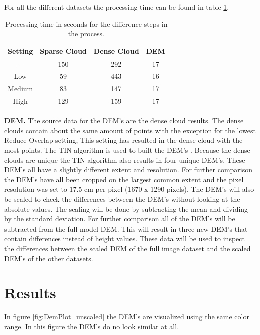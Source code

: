 \documentclass{isprs} %
\begin{document}
For all the different datasets the processing time can be found in table \ref{tab:processingTime}. 

\begin{table}[h]
    \centering
    \caption{Processing time in seconds for the difference steps in the process.}
    \label{tab:processingTime}
    \begin{tabular}{@{}cccc@{}}
    \toprule
    \textbf{Setting} & \textbf{Sparse Cloud} & \multicolumn{1}{l}{\textbf{Dense Cloud}} & \multicolumn{1}{l}{\textbf{DEM}} \\ 
    \midrule
    -      & 150 & 292 & 17 \\
    Low    & 59  & 443 & 16 \\
    Medium & 83  & 147 & 17 \\
    High   & 129 & 159 & 17 \\ \bottomrule
\end{tabular}
\end{table}

\textbf{DEM.}
The source data for the DEM's are the dense cloud results. 
The dense clouds contain about the same amount of points with the exception for the lowest Reduce Overlap setting, This setting has resulted in the dense cloud with the most points.
The TIN algorithm is used to built the DEM's \citep{axelsson1999processing}.
Because the dense clouds are unique the TIN algorithm also results in four unique DEM's.
These DEM's all have a slightly different extent and resolution.
For further comparison the DEM's have all been cropped on the largest common extent and the pixel resolution was set to 17.5 cm per pixel (1670 x 1290 pixels).
The DEM's will also be scaled to check the differences between the DEM's without looking at the absolute values.
The scaling will be done by subtracting the mean and dividing by the standard deviation.
For further comparison all of the DEM's will be subtracted from the full model DEM.
This will result in three new DEM's that contain differences instead of height values.
These data will be used to inspect the differences between the scaled DEM of the full image dataset and the scaled DEM's of the other datasets.

\section{Results}
In figure \ref{fig:DemPlot_unscaled} the DEM's are visualized using the same color range. 
In this figure the DEM's do no look similar at all.
\end{document}
